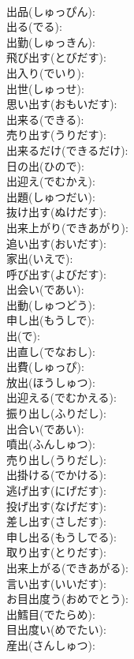 \documentclass[8pt]{extreport}
\begin{document}
\begin{CJK}{UTF8}{min}
\\	出品(しゅっぴん): 
\\	出る(でる): 
\\	出勤(しゅっきん): 
\\	飛び出す(とびだす): 
\\	出入り(でいり): 
\\	出世(しゅっせ): 
\\	思い出す(おもいだす): 
\\	出来る(できる): 
\\	売り出す(うりだす): 
\\	出来るだけ(できるだけ): 
\\	日の出(ひので): 
\\	出迎え(でむかえ): 
\\	出題(しゅつだい): 
\\	抜け出す(ぬけだす): 
\\	出来上がり(できあがり): 
\\	追い出す(おいだす): 
\\	家出(いえで): 
\\	呼び出す(よびだす): 
\\	出会い(であい): 
\\	出動(しゅつどう): 
\\	申し出(もうしで): 
\\	出(で): 
\\	出直し(でなおし): 
\\	出費(しゅっぴ): 
\\	放出(ほうしゅつ): 
\\	出迎える(でむかえる): 
\\	振り出し(ふりだし): 
\\	出合い(であい): 
\\	噴出(ふんしゅつ): 
\\	売り出し(うりだし): 
\\	出掛ける(でかける): 
\\	逃げ出す(にげだす): 
\\	投げ出す(なげだす): 
\\	差し出す(さしだす): 
\\	申し出る(もうしでる): 
\\	取り出す(とりだす): 
\\	出来上がる(できあがる): 
\\	言い出す(いいだす): 
\\	お目出度う(おめでとう): 
\\	出鱈目(でたらめ): 
\\	目出度い(めでたい): 
\\	産出(さんしゅつ): 

\end{CJK}
\end{document}
